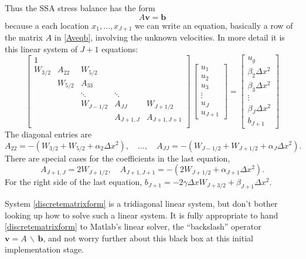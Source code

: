\documentclass[titlepage,a4paper,final,12pt]{scrartcl}
\begin{document}
Thus the SSA stress balance has the form
\begin{equation}
   A \mathbf{v} = \mathbf{b} \label{Aveqb}
\end{equation}
because a each location $x_1,\dots,x_{J+1}$ we can write an equation, basically a row of the matrix $A$ in \eqref{Aveqb}, involving the unknown velocities.  In more detail it is this linear system of $J+1$ equations:
\begin{equation}
\begin{bmatrix}
1 &  &  &  &  \\
W_{3/2} & A_{22} & W_{5/2} &  &  \\
 & W_{5/2} & A_{33} &  &  \\
 &  & \ddots & \ddots &  \\
 &  & W_{J-1/2} & A_{JJ} & W_{J+1/2} \\
 &  &  & A_{J+1,J} & A_{J+1,J+1} \\
\end{bmatrix}\,
\begin{bmatrix}
u_1 \\ u_2 \\ u_3 \\ \vdots \\ u_J \\ u_{J+1}
\end{bmatrix}
=
\begin{bmatrix}
u_g \\ \beta_2 \Delta x^2 \\ \beta_3 \Delta x^2 \\ \vdots \\ \beta_J \Delta x^2 \\ b_{J+1}
\end{bmatrix}  \label{discretematrixform}
\end{equation}
The diagonal entries are
  $$A_{22} = -(W_{3/2}+W_{5/2}+\alpha_2 \Delta x^2), \quad \dots, \quad A_{JJ} = -(W_{J-1/2}+W_{J+1/2}+\alpha_J \Delta x^2).$$
There are special cases for the coefficients in the last equation,
  $$A_{J+1,J} = 2 W_{J+1/2}, \quad A_{J+1,J+1} = -(2 W_{J+1/2}+\alpha_{J+1}\Delta x^2).$$
For the right side of the last equation, $b_{J+1} = -2 \gamma \Delta x W_{J+3/2} + \beta_{J+1} \Delta x^2$.

System \eqref{discretematrixform} is a tridiagonal linear system, but don't bother looking up how to solve such a linear system.  It is fully appropriate to hand \eqref{discretematrixform} to Matlab's linear solver, the ``backslash'' operator $\mathbf{v} = A\, \backslash\, \mathbf{b}$, and not worry further about this black box at this initial implementation stage.
\end{document}
